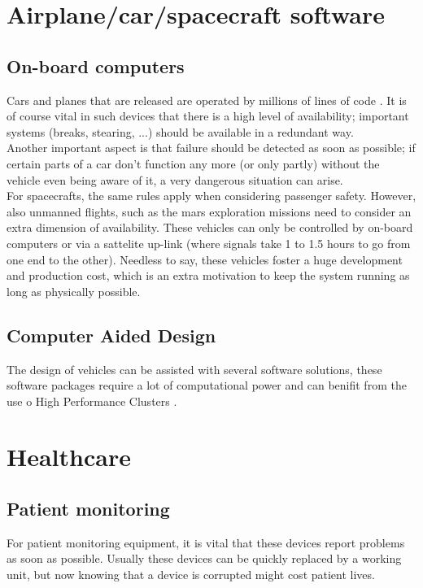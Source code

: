 \documentclass[12pt]{report}
\begin{document}
\section{Airplane/car/spacecraft software}
\subsection{On-board computers}
Cars and planes that are released are operated by millions of lines of code
\cite{ieee_cars_and_planes}. It is of course vital in such devices
that there is a high level of availability; important systems (breaks,
stearing, ...) should be available in a redundant way. \\
Another important aspect is that failure should be detected as soon as
possible; if certain parts of a car don't function any more (or only
partly) without the vehicle even being aware of it, a very dangerous
situation can arise.\\
For spacecrafts, the same rules apply when considering passenger
safety. However, also unmanned flights, such as the mars exploration missions
need to consider an extra dimension of availability. These vehicles
can only be controlled by on-board computers or via a sattelite
up-link (where signals take 1 to 1.5 hours \cite{mars_rover} to go
from one end to the other). Needless to say, these vehicles foster a
huge development and production cost, which is an extra motivation to
 keep the system running as long as physically possible.
\subsection{Computer Aided Design}
The design of vehicles can be assisted with several software
solutions, these software packages require a lot of computational
power and can benifit from the use o High Performance Clusters
\cite{hpc_cars}.

\section{Healthcare}
\subsection{Patient monitoring}
For patient monitoring equipment, it is vital that these devices
report problems as soon as possible. Usually these devices can be
quickly replaced by a working unit, but now knowing that a device is
corrupted might cost patient lives.\\
\end{document}
